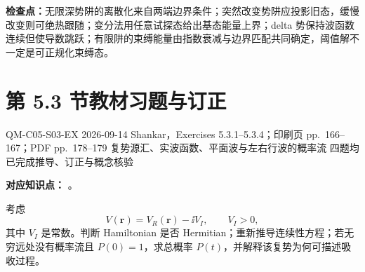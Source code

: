 \textbf{检查点：}无限深势阱的离散化来自两端边界条件；突然改变势阱应投影旧态，缓慢改变则可绝热跟随；变分法用任意试探态给出基态能量上界；delta 势保持波函数连续但使导数跳跃；有限阱的束缚能量由指数衰减与边界匹配共同确定，阈值解不一定是可正规化束缚态。

\section{第 5.3 节教材习题与订正}
\label{exercise-set:QM-C05-S03}

\exercisemeta
  {QM-C05-S03-EX}
  {2026-09-14}
  {Shankar，Exercises 5.3.1--5.3.4；印刷页 pp.~166--167；PDF pp.~178--179}
  {复势源汇、实波函数、平面波与左右行波的概率流}
  {四题均已完成推导、订正与概念核验}


\textbf{对应知识点：}
。

考虑
\begin{equation}
  V(\mathbf r)=V_R(\mathbf r)-\ii V_I,
  \qquad V_I>0,
  \label{eq:QM-C05-S03-E01-potential}
\end{equation}
其中 $V_I$ 是常数。判断 Hamiltonian 是否 Hermitian；重新推导连续性方程；若无穷远处没有概率流且 $P(0)=1$，求总概率 $P(t)$，并解释该复势为何可描述吸收过程。


